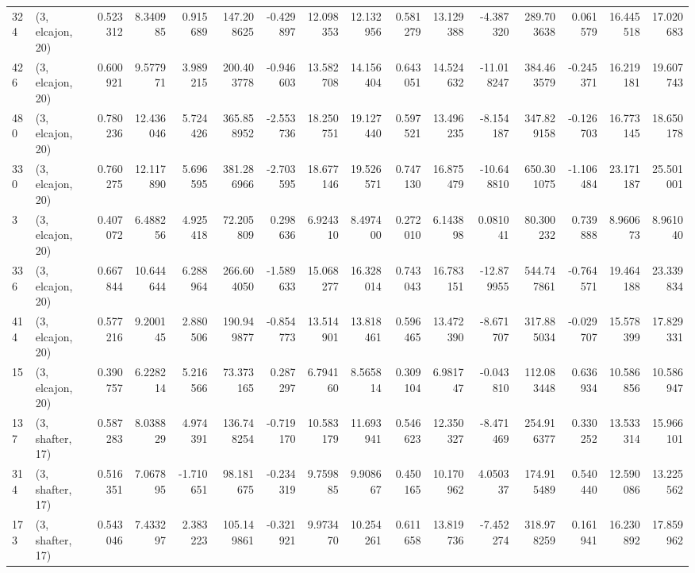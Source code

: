 \begin{tabular}{llrrrrrrrrrrrrrr}
324 &  (3, elcajon, 20) &   0.523312 &   8.340985 &   0.915689 &   147.208625 &  -0.429897 &  12.098353 &  12.132956 &  0.581279 &  13.129388 &  -4.387320 &    289.703638 &    0.061579 &   16.445518 &   17.020683 \\
426 &  (3, elcajon, 20) &   0.600921 &   9.577971 &   3.989215 &   200.403778 &  -0.946603 &  13.582708 &  14.156404 &  0.643051 &  14.524632 & -11.018247 &    384.463579 &   -0.245371 &   16.219181 &   19.607743 \\
480 &  (3, elcajon, 20) &   0.780236 &  12.436046 &   5.724426 &   365.858952 &  -2.553736 &  18.250751 &  19.127440 &  0.597521 &  13.496235 &  -8.154187 &    347.829158 &   -0.126703 &   16.773145 &   18.650178 \\
330 &  (3, elcajon, 20) &   0.760275 &  12.117890 &   5.696595 &   381.286966 &  -2.703595 &  18.677146 &  19.526571 &  0.747130 &  16.875479 & -10.648810 &    650.301075 &   -1.106484 &   23.171187 &   25.501001 \\
3   &  (3, elcajon, 20) &   0.407072 &   6.488256 &   4.925418 &    72.205809 &   0.298636 &   6.924310 &   8.497400 &  0.272010 &   6.143898 &   0.081041 &     80.300232 &    0.739888 &    8.960673 &    8.961040 \\
336 &  (3, elcajon, 20) &   0.667844 &  10.644644 &   6.288964 &   266.604050 &  -1.589633 &  15.068277 &  16.328014 &  0.743043 &  16.783151 & -12.879955 &    544.747861 &   -0.764571 &   19.464188 &   23.339834 \\
414 &  (3, elcajon, 20) &   0.577216 &   9.200145 &   2.880506 &   190.949877 &  -0.854773 &  13.514901 &  13.818461 &  0.596465 &  13.472390 &  -8.671707 &    317.885034 &   -0.029707 &   15.578399 &   17.829331 \\
15  &  (3, elcajon, 20) &   0.390757 &   6.228214 &   5.216566 &    73.373165 &   0.287297 &   6.794160 &   8.565814 &  0.309104 &   6.981747 &  -0.043810 &    112.083448 &    0.636934 &   10.586856 &   10.586947 \\
137 &  (3, shafter, 17) &   0.587283 &   8.038829 &   4.974391 &   136.748254 &  -0.719170 &  10.583179 &  11.693941 &  0.546623 &  12.350327 &  -8.471469 &    254.916377 &    0.330252 &   13.533314 &   15.966101 \\
314 &  (3, shafter, 17) &   0.516351 &   7.067895 &  -1.710651 &    98.181675 &  -0.234319 &   9.759885 &   9.908667 &  0.450165 &  10.170962 &   4.050337 &    174.915489 &    0.540440 &   12.590086 &   13.225562 \\
173 &  (3, shafter, 17) &   0.543046 &   7.433297 &   2.383223 &   105.149861 &  -0.321921 &   9.973470 &  10.254261 &  0.611658 &  13.819736 &  -7.452274 &    318.978259 &    0.161941 &   16.230892 &   17.859962 \\

\end{tabular}
